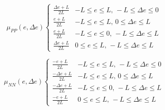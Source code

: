 \begin{equation}
\mu_{PP}(e,\Delta e)\begin{cases}
    \frac{\Delta e+L}{2L} & -L\leq e\leq L,\,-L\leq \Delta e\leq 0 \\
    \frac{e+L}{2L}& -L\leq e\leq L,\,0\leq \Delta e\leq L \\
    \frac{e+L}{2L}& -L\leq e\leq 0,\,-L\leq \Delta e\leq L \\
    \frac{\Delta e+L}{2L} & 0\leq e\leq L,\,-L\leq \Delta e\leq L 
\end{cases}
\end{equation}

\begin{equation}
\mu_{NN}(e,\Delta e)\begin{cases}
    \frac{-e+L}{2L} & -L\leq e\leq L,\,-L\leq \Delta e\leq 0 \\
    \frac{-\Delta e+L}{2L} & -L\leq e\leq L,\,0\leq \Delta e\leq L \\
    \frac{-\Delta e+L}{2L}& -L\leq e\leq 0,\,-L\leq \Delta e\leq L \\
    \frac{-e+L}{2L}& 0\leq e\leq L,\,-L\leq \Delta e\leq L 
\end{cases}
\end{equation}

